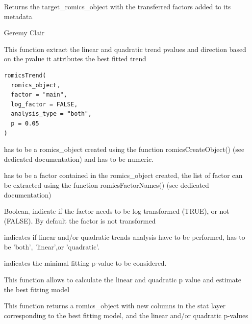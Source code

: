 \documentclass[a4paper]{book}
\begin{document}
%
\begin{Value}
Returns the target\_romics\_object with the transferred factors added to its metadata
\end{Value}
%
\begin{Author}
Geremy Clair
\end{Author}
%
\begin{Description}
This function extract the linear and quadratic trend pvalues and direction based on the pvalue it attributes the best fitted trend
\end{Description}
%
\begin{Usage}
\begin{verbatim}
romicsTrend(
  romics_object,
  factor = "main",
  log_factor = FALSE,
  analysis_type = "both",
  p = 0.05
)
\end{verbatim}
\end{Usage}
%
\begin{Arguments}
\begin{ldescription}
\item[\code{romics\_object}] has to be a romics\_object created using the function romicsCreateObject() (see dedicated documentation) and has to be numeric.

\item[\code{factor}] has to be a factor contained in the romics\_object created, the list of factor can be extracted using the function romicsFactorNames() (see dedicated documentation)

\item[\code{log\_factor}] Boolean, indicate if the factor needs to be log transformed (TRUE), or not (FALSE). By default the factor is not transformed

\item[\code{analysis\_type}] indicates if linear and/or quadratic trends analysis have to be performed, has to be 'both', 'linear',or 'quadratic'.

\item[\code{p}] indicates the minimal fitting p-value to be considered.
\end{ldescription}
\end{Arguments}
%
\begin{Details}
This function allows to calculate the linear and quadratic p value and estimate the best fitting model
\end{Details}
%
\begin{Value}
This function returns a romics\_object with new columns in the stat layer corresponding to the best fitting model, and the linear and/or quadratic p-values
\end{Value}
\end{document}
